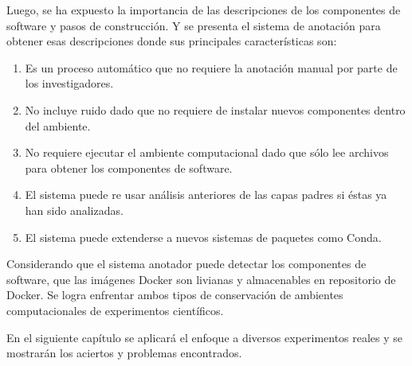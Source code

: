 Luego, se ha expuesto la importancia de las descripciones de los componentes de software y pasos de construcción.
Y se presenta el sistema de anotación para obtener esas descripciones donde sus principales características son:
\begin{enumerate}
	\item Es un proceso automático que no requiere la anotación manual por parte de los investigadores.
	\item No incluye ruido dado que no requiere de instalar nuevos componentes dentro del ambiente.
	\item No requiere ejecutar el ambiente  computacional dado que  sólo lee archivos para obtener los componentes de software.
	\item El sistema puede re usar análisis anteriores de las capas padres si éstas ya han sido analizadas.
	\item El sistema puede extenderse a nuevos sistemas de paquetes como Conda.
\end{enumerate}

Considerando que el sistema anotador puede detectar los componentes de software, que las imágenes Docker son livianas y almacenables en repositorio de Docker. Se logra enfrentar ambos tipos de conservación de ambientes computacionales de experimentos científicos. 

En el siguiente capítulo se aplicará el enfoque a diversos experimentos reales y se mostrarán los aciertos y problemas encontrados.
